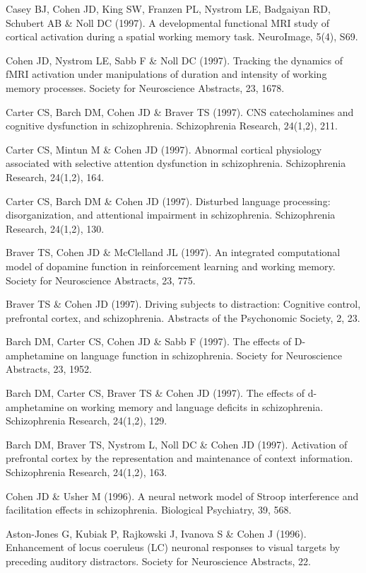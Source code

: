 \documentclass[10 pt]{article}
\begin{document}
Casey BJ, Cohen JD, King SW, Franzen PL, Nystrom LE, Badgaiyan RD, Schubert AB \& Noll DC (1997). A developmental functional MRI study of cortical activation during a spatial working memory task. NeuroImage, 5(4), S69.

Cohen JD, Nystrom LE, Sabb F \& Noll DC (1997). Tracking the dynamics of fMRI activation under manipulations of duration and intensity of working memory processes. Society for Neuroscience Abstracts, 23, 1678.

Carter CS, Barch DM, Cohen JD \& Braver TS (1997). CNS catecholamines and cognitive dysfunction in schizophrenia. Schizophrenia Research, 24(1,2), 211.

Carter CS, Mintun M \& Cohen JD (1997). Abnormal cortical physiology associated with selective attention dysfunction in schizophrenia. Schizophrenia Research, 24(1,2), 164.

Carter CS, Barch DM \& Cohen JD (1997). Disturbed language processing: disorganization, and attentional impairment in schizophrenia. Schizophrenia Research, 24(1,2), 130.

Braver TS, Cohen JD \& McClelland JL (1997). An integrated computational model of dopamine function in reinforcement learning and working memory. Society for Neuroscience Abstracts, 23, 775.

Braver TS \& Cohen JD (1997). Driving subjects to distraction: Cognitive control, prefrontal cortex, and schizophrenia. Abstracts of the Psychonomic Society, 2, 23.

Barch DM, Carter CS, Cohen JD \& Sabb F (1997). The effects of D-amphetamine on language function in schizophrenia. Society for Neuroscience Abstracts, 23, 1952.

Barch DM, Carter CS, Braver TS \& Cohen JD (1997). The effects of d-amphetamine on working memory and language deficits in schizophrenia. Schizophrenia Research, 24(1,2), 129.

Barch DM, Braver TS, Nystrom L, Noll DC \& Cohen JD (1997). Activation of prefrontal cortex by the representation and maintenance of context information. Schizophrenia Research, 24(1,2), 163.

Cohen JD \& Usher M (1996). A neural network model of Stroop interference and facilitation effects in schizophrenia. Biological Psychiatry, 39, 568.

Aston-Jones G, Kubiak P, Rajkowski J, Ivanova S \& Cohen J (1996). Enhancement of locus coeruleus (LC) neuronal responses to visual targets by preceding auditory distractors. Society for Neuroscience Abstracts, 22.
\end{document}
